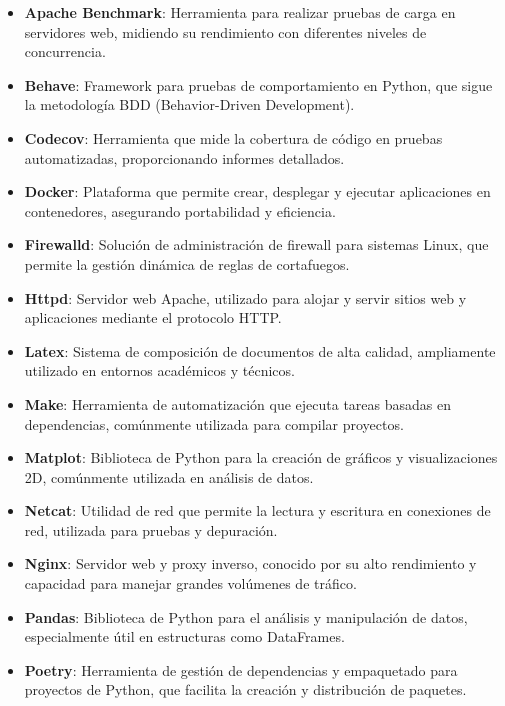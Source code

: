 \begin{itemize}
    \item \textbf{Apache Benchmark}\cite{ab}: Herramienta para realizar pruebas de carga en servidores web, midiendo su rendimiento con diferentes niveles de concurrencia.
    \item \textbf{Behave}\cite{behave}: Framework para pruebas de comportamiento en Python, que sigue la metodología BDD (Behavior-Driven Development).
    \item \textbf{Codecov}\cite{codecov}: Herramienta que mide la cobertura de código en pruebas automatizadas, proporcionando informes detallados.
    \item \textbf{Docker}\cite{docker}: Plataforma que permite crear, desplegar y ejecutar aplicaciones en contenedores, asegurando portabilidad y eficiencia.
    \item \textbf{Firewalld}\cite{firewalld}: Solución de administración de firewall para sistemas Linux, que permite la gestión dinámica de reglas de cortafuegos.
    \item \textbf{Httpd}\cite{apache}: Servidor web Apache, utilizado para alojar y servir sitios web y aplicaciones mediante el protocolo HTTP.
    \item \textbf{Latex}\cite{latex}: Sistema de composición de documentos de alta calidad, ampliamente utilizado en entornos académicos y técnicos.
    \item \textbf{Make}\cite{make}: Herramienta de automatización que ejecuta tareas basadas en dependencias, comúnmente utilizada para compilar proyectos.
    \item \textbf{Matplot}\cite{matplot}: Biblioteca de Python para la creación de gráficos y visualizaciones 2D, comúnmente utilizada en análisis de datos.
    \item \textbf{Netcat}\cite{netcat}: Utilidad de red que permite la lectura y escritura en conexiones de red, utilizada para pruebas y depuración.
    \item \textbf{Nginx}\cite{nginx}: Servidor web y proxy inverso, conocido por su alto rendimiento y capacidad para manejar grandes volúmenes de tráfico.
    \item \textbf{Pandas}\cite{pandas}: Biblioteca de Python para el análisis y manipulación de datos, especialmente útil en estructuras como DataFrames.
    \item \textbf{Poetry}\cite{poetry}: Herramienta de gestión de dependencias y empaquetado para proyectos de Python, que facilita la creación y distribución de paquetes.

\end{itemize}
